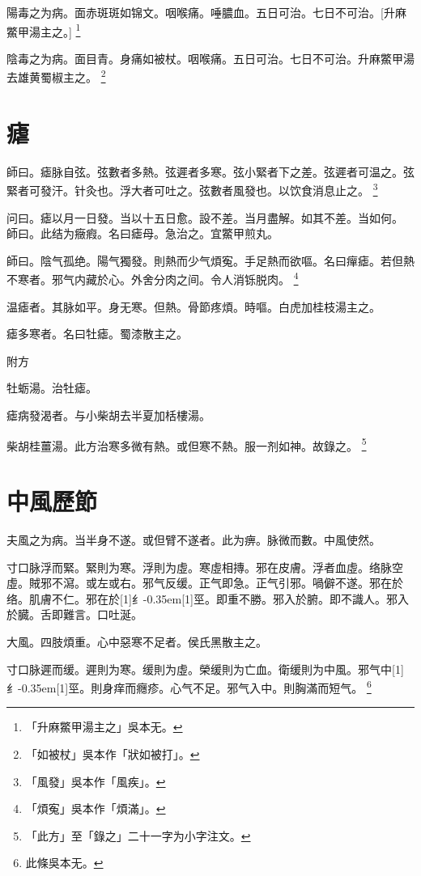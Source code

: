 \documentclass[oneside,b4paper]{ctexbook}
\begin{document}
\begin{flushleft}
陽毒之为病。面赤斑斑如锦文。咽喉痛。唾膿血。五日可治。七日不可治。[升麻鱉甲湯主之。]
\footnote{「升麻鱉甲湯主之」吳本无。}

陰毒之为病。面目青。身痛如被杖。咽喉痛。五日可治。七日不可治。升麻鱉甲湯去雄黄蜀椒主之。
\footnote{「如被杖」吳本作「狀如被打」。}

\chapter{瘧}

師曰。瘧脉自弦。弦數者多熱。弦遲者多寒。弦小緊者下之差。弦遲者可温之。弦緊者可發汗。针灸也。浮大者可吐之。弦數者風發也。以饮食消息止之。
\footnote{「風發」吳本作「風疾」。}

问曰。瘧以月一日發。当以十五日愈。設不差。当月盡解。如其不差。当如何。\\
師曰。此结为癥瘕。名曰瘧母。急治之。宜鱉甲煎丸。

師曰。陰气孤绝。陽气獨發。則熱而少气煩寃。手足熱而欲嘔。名曰癉瘧。若但熱不寒者。邪气内藏於心。外舍分肉之间。令人消铄脱肉。
\footnote{「煩寃」吳本作「煩滿」。}

温瘧者。其脉如平。身无寒。但熱。骨節疼煩。時嘔。白虎加桂枝湯主之。

瘧多寒者。名曰牡瘧。蜀漆散主之。

附方

牡蛎湯。治牡瘧。

瘧病發渴者。与小柴胡去半夏加栝樓湯。

柴胡桂薑湯。此方治寒多微有熱。或但寒不熱。服一剂如神。故錄之。
\footnote{「此方」至「錄之」二十一字为小字注文。}

\chapter{中風歷節}

夫風之为病。当半身不遂。或但臂不遂者。此为痹。脉微而數。中風使然。

寸口脉浮而緊。緊則为寒。浮則为虛。寒虛相摶。邪在皮膚。浮者血虛。络脉空虛。賊邪不瀉。或左或右。邪气反缓。正气即急。正气引邪。喎僻不遂。邪在於络。肌膚不仁。邪在於{\hbox{\scalebox{0.68}[1]{纟}\kern-0.35em\scalebox{0.64}[1]{巠}}}。即重不勝。邪入於腑。即不識人。邪入於臓。舌即難言。口吐涎。

大風。四肢煩重。心中惡寒不足者。侯氏黑散主之。

寸口脉遲而缓。遲則为寒。缓則为虛。榮缓則为亡血。衛缓則为中風。邪气中{\hbox{\scalebox{0.68}[1]{纟}\kern-0.35em\scalebox{0.64}[1]{巠}}}。則身痒而癮疹。心气不足。邪气入中。則胸滿而短气。
\footnote{此條吳本无。}


\end{flushleft}
\end{document}
